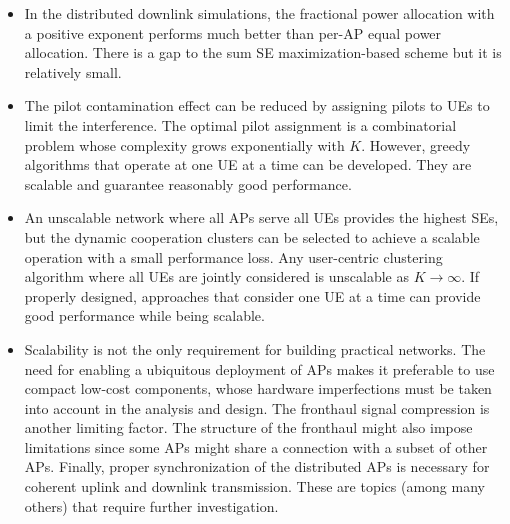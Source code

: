 \begin{mdframed}[style=GrayFrame]

\begin{itemize}

\item In the distributed downlink simulations, the fractional power allocation with a positive exponent performs much better than per-AP equal power allocation. There is a gap to the sum SE maximization-based scheme but it is relatively small.

\item The pilot contamination effect can be reduced by assigning pilots to UEs to limit the interference. The optimal pilot assignment is a combinatorial problem whose complexity grows exponentially with $K$. However, greedy algorithms that operate at one UE at a time can be developed. They are scalable and guarantee reasonably good performance.

\item An unscalable network where all APs serve all UEs provides the highest SEs, but the dynamic cooperation clusters can be selected to achieve a scalable operation with a small performance loss. Any user-centric clustering algorithm where all UEs are jointly considered is unscalable as $K\to \infty$. If properly designed, approaches that consider one UE at a time can provide good performance while being scalable.

\item Scalability is not the only requirement for building practical networks. The need for enabling a ubiquitous deployment of APs makes it preferable to use compact low-cost components, whose hardware imperfections must be taken into account in the analysis and design. The fronthaul signal compression is another limiting factor. The structure of the fronthaul might also impose limitations since some APs might share a connection with a subset of other APs. Finally, proper synchronization of the distributed APs is necessary for coherent uplink and downlink transmission. These are topics (among many others) that require further investigation.


\end{itemize}

\end{mdframed}


